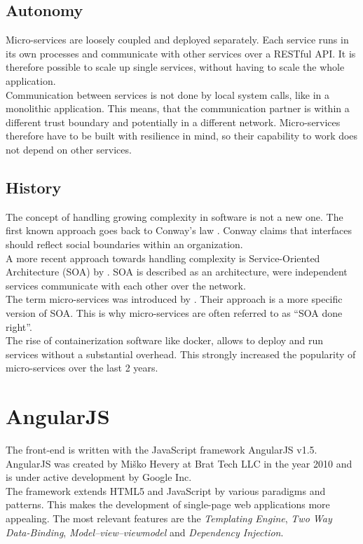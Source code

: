 \subsection{Autonomy}
Micro-services are loosely coupled and deployed separately. Each service runs in its own processes and communicate with other services over a RESTful API. It is therefore possible to scale up single services, without having to scale the whole application.\\
Communication between services is not done by local system calls, like in a monolithic application. This means, that the communication partner is within a different trust boundary and potentially in a different network. Micro-services therefore have to be built with resilience in mind, so their capability to work does not depend on other services.


\subsection{History}
The concept of handling growing complexity in software is not a new one. The first known approach goes back to Conway's law \cite{conway1968committees}. Conway claims that interfaces should reflect social boundaries within an organization.\\
A more recent approach towards handling complexity is Service-Oriented Architecture (SOA) by \cite{as2005service}. SOA is described as an architecture, were independent services communicate with each other over the network.\\
The term micro-services was introduced by \cite{martinfowler2014microservices}. Their approach is a more specific version of SOA. This is why micro-services are often referred to as \enquote{SOA done right}.\\
The rise of containerization software like docker, allows to deploy and run services without a substantial overhead. This strongly increased the popularity of micro-services over the last 2 years.



\section{AngularJS}
\label{sec:angularjs}
The front-end is written with the JavaScript framework AngularJS v1.5. AngularJS was created by Miško Hevery at Brat Tech LLC in the year 2010 and is under active development by Google Inc. \\
The framework extends HTML5 and JavaScript by various paradigms and patterns. This makes the development of single-page web applications more appealing. The most relevant features are the \textit{Templating Engine}, \textit{Two Way Data-Binding}, \textit{Model–view–viewmodel} and \textit{Dependency Injection}.



